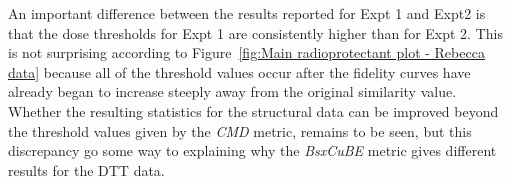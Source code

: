 An important difference between the results reported for Expt 1 and Expt2 is that the dose thresholds for Expt 1 are consistently higher than for Expt 2.
This is not surprising according to Figure~\ref{fig:Main radioprotectant plot - Rebecca data} because all of the threshold values occur after the fidelity curves have already began to increase steeply away from the original similarity value.
Whether the resulting statistics for the structural data can be improved beyond the threshold values given by the \textit{CMD} metric, remains to be seen, but this discrepancy go some way to explaining why the \textit{BsxCuBE} metric gives different results for the DTT data.
